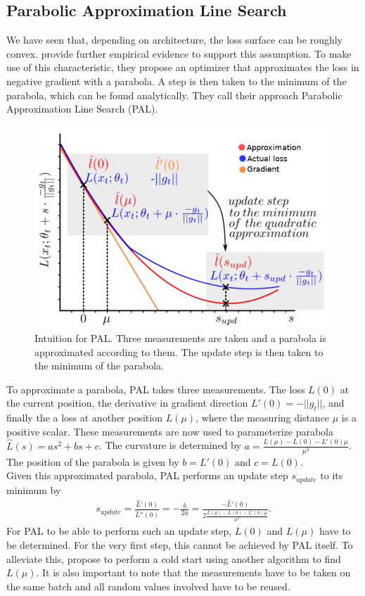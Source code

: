 \documentclass[a4paper]{scrartcl}
\begin{document}
\subsection*{Parabolic Approximation Line Search}
We have seen that, depending on architecture, the loss surface can be roughly convex. \cite{mutschler2020parabolic} provide further empirical evidence to support this assumption. To make use of this characteristic, they propose an optimizer that approximates the loss in negative gradient with a parabola. A step is then taken to the minimum of the parabola, which can be found analytically. They call their approach Parabolic Approximation Line Search (PAL).

\begin{figure}[H]
	\centering
	\includegraphics[width=.6\linewidth]{figures/pal_1.png}
	\caption{Intuition for PAL. Three measurements are taken and a parabola is approximated according to them. The update step is then taken to the minimum of the parabola.}
	\label{fig:pal}
\end{figure}
To approximate a parabola, PAL takes three measurements. The loss $L(0)$ at the current position, the derivative in gradient direction $L'(0) = - ||g_t||$, and finally the a loss at another position $L(\mu)$, where the measuring distance $\mu$ is a positive scalar. These measurements are now used to parameterize parabola $\hat{L}(s) = as^2 + bs + c$. The curvature is determined by $a = \frac{L(\mu)-L(0) - L'(0)\mu}{\mu^2}$. The position of the parabola is given by $b=L'(0)$ and $c=L(0)$.\\
Given this approximated parabola, PAL performs an update step $s_{update}$ to its minimum by
\begin{align}
	s_{update} = \frac{\hat{L}'(0)}{\hat{L}''(0)} = -\frac{b}{2a} = \frac{-\hat{L}'(0)}{2\frac{L(\mu)-L(0) - L'(0)\mu}{\mu^2}}.
\end{align}
For PAL to be able to perform such an update step, $L(0)$ and $L(\mu)$ have to be determined. For the very first step, this cannot be achieved by PAL itself. To alleviate this, \cite{mutschler2020parabolic} propose to perform a cold start using another algorithm to find  $L(\mu)$. It is also important to note that the measurements have to be taken on the same batch and all random values involved have to be reused.\\
\end{document}
